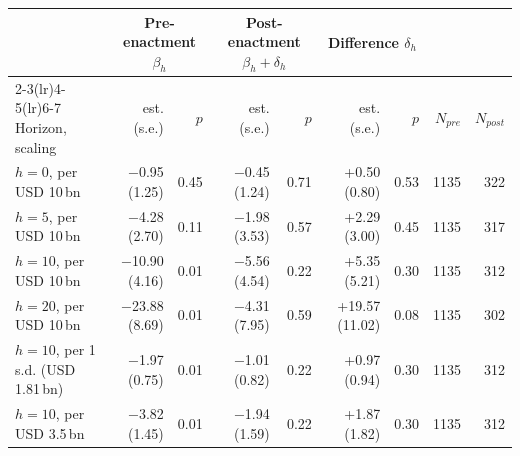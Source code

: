 \begin{tabular}{lrrrrrrrr}
\toprule
 & \multicolumn{2}{c}{Pre-enactment $\beta_h$} & \multicolumn{2}{c}{Post-enactment $\beta_h+\delta_h$} & \multicolumn{2}{c}{Difference $\delta_h$} & & \\
\cmidrule(lr){2-3}\cmidrule(lr){4-5}\cmidrule(lr){6-7}
Horizon, scaling & est. (s.e.) & $p$ & est. (s.e.) & $p$ & est. (s.e.) & $p$ & $N_{pre}$ & $N_{post}$ \\
\midrule
$h=0$, per USD 10\,bn & \ensuremath{-}0.95 (1.25) & 0.45 & \ensuremath{-}0.45 (1.24) & 0.71 & +0.50 (0.80) & 0.53 & 1135 & 322 \\
$h=5$, per USD 10\,bn & \ensuremath{-}4.28 (2.70) & 0.11 & \ensuremath{-}1.98 (3.53) & 0.57 & +2.29 (3.00) & 0.45 & 1135 & 317 \\
$h=10$, per USD 10\,bn & \ensuremath{-}10.90 (4.16) & 0.01 & \ensuremath{-}5.56 (4.54) & 0.22 & +5.35 (5.21) & 0.30 & 1135 & 312 \\
$h=20$, per USD 10\,bn & \ensuremath{-}23.88 (8.69) & 0.01 & \ensuremath{-}4.31 (7.95) & 0.59 & +19.57 (11.02) & 0.08 & 1135 & 302 \\
$h=10$, per 1 s.d. (USD 1.81\,bn) & \ensuremath{-}1.97 (0.75) & 0.01 & \ensuremath{-}1.01 (0.82) & 0.22 & +0.97 (0.94) & 0.30 & 1135 & 312 \\
$h=10$, per USD 3.5\,bn & \ensuremath{-}3.82 (1.45) & 0.01 & \ensuremath{-}1.94 (1.59) & 0.22 & +1.87 (1.82) & 0.30 & 1135 & 312 \\
\bottomrule
\end{tabular}
